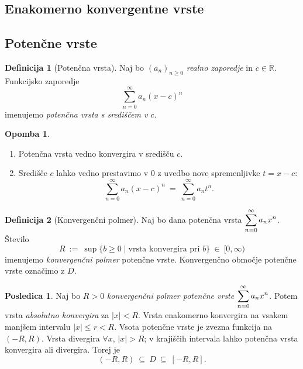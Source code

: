 \documentclass[11pt]{article}
\theoremstyle{definition}
\newtheorem{definicija}{Definicija}[section]
\theoremstyle{definition}
\theoremstyle{definition}
\theoremstyle{theorem}
\newtheorem*{posledica}{Posledica}
\newtheorem*{opomba}{Opomba}
\begin{document}

\subsection{Enakomerno konvergentne vrste}
\vspace{0.5cm}


\subsection{Potenčne vrste}
\vspace{0.5cm}

\begin{definicija}[Potenčna vrsta]

Naj bo $(a_n)_{n \geq 0}$ \textit{realno zaporedje} in $c \in \mathbb{R}$. Funkcijsko zaporedje $$\sum_{n=0}^{\infty} a_n (x - c)^n$$
imenujemo \textit{potenčna vrsta s središčem v $c$}.

\end{definicija}
\vspace{0.5cm}

\begin{opomba}
~
\begin{enumerate}
	\item Potenčna vrsta vedno konvergira v središču $c$.
	\item Središče $c$ lahko vedno prestavimo v $0$ z uvedbo nove spremenljivke $t = x - c$:
	$$\sum_{n=0}^{\infty} a_n (x-c)^n ~=~ \sum_{n=0}^{\infty} a_n t^n.$$
\end{enumerate}
\end{opomba}
\vspace{0.5cm}

\begin{definicija}[Konvergenčni polmer]

Naj bo dana potenčna vrsta $\mathlarger{\sum_{n=0}^{\infty} a_n x^n}$. Število
$$R ~:=~ \sup \{b \geq 0 \mid \text{vrsta konvergira pri } b \} ~\in~ [0, \infty)$$
imenujemo \textit{konvergenčni polmer} potenčne vrste. Konvergenčno območje potenčne vrste označimo z $D$.

\end{definicija}
\vspace{0.5cm}

\begin{posledica}

Naj bo $R > 0$ \textit{konvergenčni polmer potenčne vrste} $\mathlarger{\sum_{n=0}^{\infty} a_n x^n}$. Potem vrsta \textit{absolutno konvergira} za $|x| < R$. Vrsta enakomerno konvergira na vsakem manjšem intervalu $|x| \leq r < R$. Vsota potenčne vrste je zvezna funkcija na $(-R, R)$. Vrsta divergira $\forall x$, $|x| > R$; v krajiščih intervala lahko potenčna vrsta konvergira ali divergira. Torej je
$$(-R, R) ~\subseteq~ D ~\subseteq~ [-R, R].$$

\end{posledica}
\vspace{0.5cm}
\end{document}
